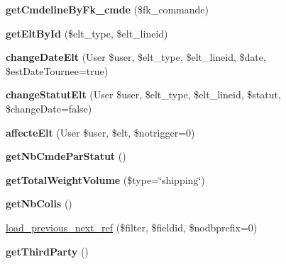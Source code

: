 \begin{DoxyCompactItemize}
{\bfseries get\+Cmdeline\+By\+Fk\+\_\+cmde} (\$fk\+\_\+commande)
\item 
\mbox{\label{classTourneeUnique__lines_a13f722324568b3ddb1fc744544d72c29}} 
{\bfseries get\+Elt\+By\+Id} (\$elt\+\_\+type, \$elt\+\_\+lineid)
\item 
\mbox{\label{classTourneeUnique__lines_a12baefe580c8492ab303c9d78626171b}} 
{\bfseries change\+Date\+Elt} (User \$user, \$elt\+\_\+type, \$elt\+\_\+lineid, \$date, \$est\+Date\+Tournee=true)
\item 
\mbox{\label{classTourneeUnique__lines_abac5fe2d2b68ac3f55451f38865cd1f0}} 
{\bfseries change\+Statut\+Elt} (User \$user, \$elt\+\_\+type, \$elt\+\_\+lineid, \$statut, \$change\+Date=false)
\item 
\mbox{\label{classTourneeUnique__lines_acffe80430f18582d3319de73d98d7b82}} 
{\bfseries affecte\+Elt} (User \$user, \$elt, \$notrigger=0)
\item 
\mbox{\label{classTourneeUnique__lines_a907d079f0694fa6417630c0a42108002}} 
{\bfseries get\+Nb\+Cmde\+Par\+Statut} ()
\item 
\mbox{\label{classTourneeUnique__lines_a0608782bf788644961453f6a8cdd39e1}} 
{\bfseries get\+Total\+Weight\+Volume} (\$type=\char`\"{}shipping\char`\"{})
\item 
\mbox{\label{classTourneeUnique__lines_a320d3a9fb8fe68979e4818a42bd90644}} 
{\bfseries get\+Nb\+Colis} ()
\item 
\hyperlink{classTourneeUnique__lines_a4bc3b587051c3bab79f2e9dab96b3cad}{load\+\_\+previous\+\_\+next\+\_\+ref} (\$filter, \$fieldid, \$nodbprefix=0)
\item 
\mbox{\label{classTourneeUnique__lines_a67ecbcb6d520323da23127c49b641bab}} 
{\bfseries get\+Third\+Party} ()
\end{DoxyCompactItemize}
